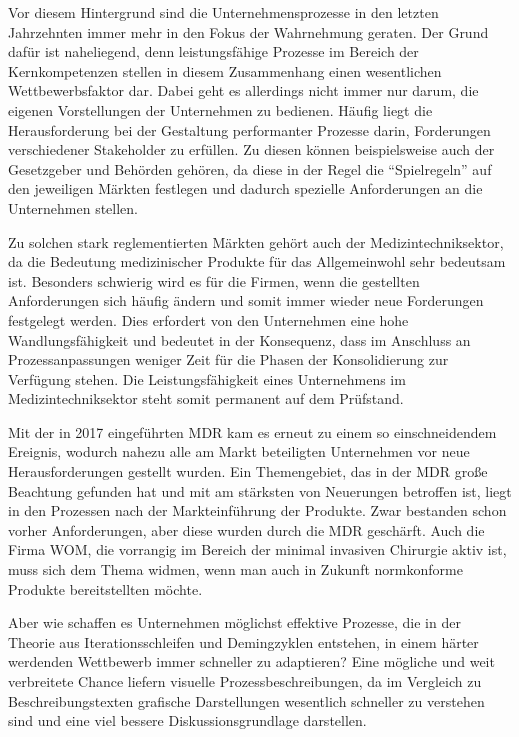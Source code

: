 \documentclass[a4paper,12pt]{report}
\begin{document}
Vor diesem Hintergrund sind die Unternehmensprozesse in den letzten Jahrzehnten immer mehr in den Fokus der Wahrnehmung geraten. Der Grund dafür ist naheliegend, denn leistungsfähige Prozesse im Bereich der Kernkompetenzen stellen in diesem Zusammenhang einen wesentlichen Wettbewerbsfaktor dar. Dabei geht es allerdings nicht immer nur darum, die eigenen Vorstellungen der Unternehmen zu bedienen. Häufig liegt die Herausforderung bei der Gestaltung performanter Prozesse darin, Forderungen verschiedener Stakeholder zu erfüllen. Zu diesen können beispielsweise auch der Gesetzgeber und Behörden gehören, da diese in der Regel die "`Spielregeln"' auf den jeweiligen Märkten festlegen und dadurch spezielle Anforderungen an die Unternehmen stellen.

Zu solchen stark reglementierten Märkten gehört auch der Medizintechniksektor, da die Bedeutung medizinischer Produkte für das Allgemeinwohl sehr bedeutsam ist. Besonders schwierig wird es für die Firmen, wenn die gestellten Anforderungen sich häufig ändern und somit immer wieder neue Forderungen festgelegt werden. Dies erfordert von den Unternehmen eine hohe Wandlungsfähigkeit und bedeutet in der Konsequenz, dass im Anschluss an Prozessanpassungen weniger Zeit für die Phasen der Konsolidierung zur Verfügung stehen. Die Leistungsfähigkeit eines Unternehmens im Medizintechniksektor steht somit permanent auf dem Prüfstand.

Mit der in 2017 eingeführten MDR kam es erneut zu einem so einschneidendem Ereignis, wodurch nahezu alle am Markt beteiligten Unternehmen vor neue Herausforderungen gestellt wurden. Ein Themengebiet, das in der MDR große Beachtung gefunden hat und mit am stärksten von Neuerungen betroffen ist, liegt in den Prozessen nach der Markteinführung der Produkte. Zwar bestanden schon vorher Anforderungen, aber diese wurden durch die MDR geschärft. Auch die Firma WOM, die vorrangig im Bereich der minimal invasiven Chirurgie aktiv ist, muss sich dem Thema widmen, wenn man auch in Zukunft normkonforme Produkte bereitstellten möchte.

Aber wie schaffen es Unternehmen möglichst effektive Prozesse, die in der Theorie aus Iterationsschleifen und Demingzyklen entstehen, in einem härter werdenden Wettbewerb immer schneller zu adaptieren? Eine mögliche und weit verbreitete Chance liefern visuelle Prozessbeschreibungen, da im Vergleich zu Beschreibungstexten grafische Darstellungen wesentlich schneller zu verstehen sind und eine viel bessere Diskussionsgrundlage darstellen.
\end{document}
